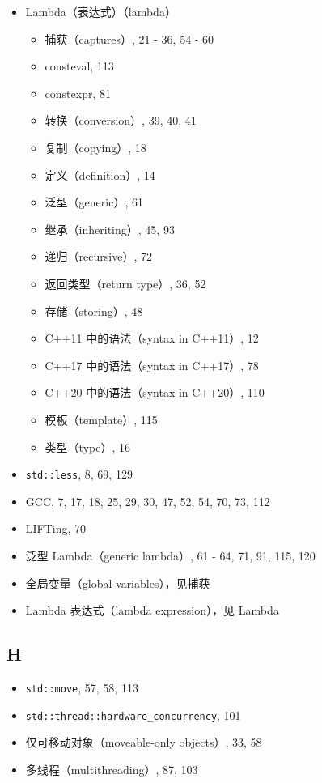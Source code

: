 \begin{itemize}
\item Lambda（表达式）（lambda）
  \begin{itemize}
  \item 捕获（captures）, 21 - 36, 54 - 60
  \item consteval, 113
  \item constexpr, 81
  \item 转换（conversion）, 39, 40, 41
  \item 复制（copying）, 18
  \item 定义（definition）, 14
  \item 泛型（generic）, 61
  \item 继承（inheriting）, 45, 93
  \item 递归（recursive）, 72
  \item 返回类型（return type）, 36, 52
  \item 存储（storing）, 48
  \item C++11 中的语法（syntax in C++11）, 12
  \item C++17 中的语法（syntax in C++17）, 78
  \item C++20 中的语法（syntax in C++20）, 110
  \item 模板（template）, 115
  \item 类型（type）, 16
  \end{itemize}
\item \texttt{std::less}, 8, 69, 129
\item GCC, 7, 17, 18, 25, 29, 30, 47, 52, 54, 70, 73, 112
\item LIFTing, 70
\item 泛型 Lambda（generic lambda）, 61 - 64, 71, 91, 115, 120
\item 全局变量（global variables），见捕获
\item Lambda 表达式（lambda expression），见 Lambda
\end{itemize}

\subsection{H}

\begin{itemize}
\item \texttt{std::move}, 57, 58, 113
\item \texttt{std::thread::hardware\_concurrency}, 101
\item 仅可移动对象（moveable-only objects）, 33, 58
\item 多线程（multithreading）, 87, 103
\end{itemize}

